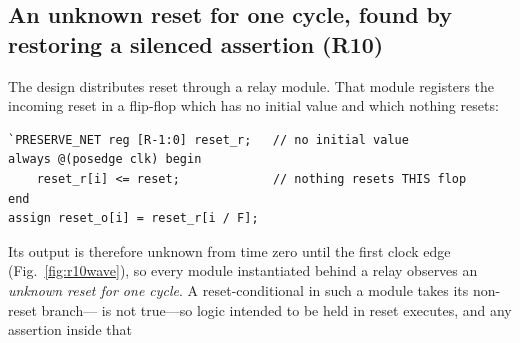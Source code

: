 \documentclass[conference]{IEEEtran}
\newcommand{\code}[1]{\texttt{\detokenize{#1}}}
\begin{document}
\subsection{An unknown reset for one cycle, found by restoring a
	silenced assertion (R10)}
\label{sec:r10}
The design distributes reset through a relay module. That module
registers the incoming reset in a flip-flop which has no initial value
and which nothing resets:

\begin{lstlisting}
`PRESERVE_NET reg [R-1:0] reset_r;   // no initial value
always @(posedge clk) begin
    reset_r[i] <= reset;             // nothing resets THIS flop
end
assign reset_o[i] = reset_r[i / F];
\end{lstlisting}

Its output is therefore unknown from time zero until the first clock
edge (Fig.~\ref{fig:r10wave}), so every module instantiated behind a
relay observes an
\emph{unknown reset for one cycle}. A reset-conditional in such a module
takes its non-reset branch---\code{if (X)} is not true---so logic
intended to be held in reset executes, and any assertion inside that
\end{document}
